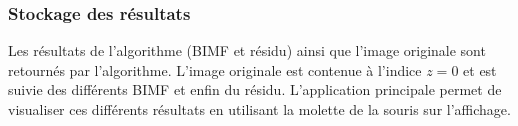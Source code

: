\subsubsection{Stockage des résultats}
Les résultats de l'algorithme (BIMF et résidu) ainsi que l'image originale sont retournés par l'algorithme. L'image originale est contenue à l'indice $z=0$ et est suivie des différents BIMF et enfin du résidu. L'application principale permet de visualiser ces différents résultats en utilisant la molette de la souris sur l'affichage.
